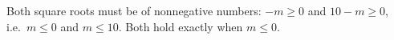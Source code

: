 Both square roots must be of nonnegative numbers: $-m\ge0$ and $10-m\ge0$, i.e.\ $m\le0$ and $m\le10$. Both hold exactly when $\boxed{m\le0}$.
